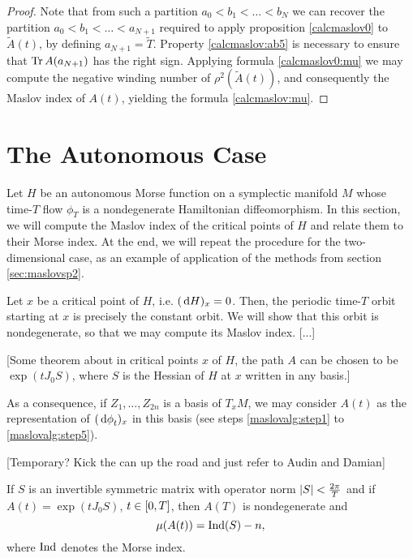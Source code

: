 \begin{proof}
Note that from such a partition $a_0 < b_1 < \dots < b_N$ we can recover the partition $a_0 < b_1 < \dots < a_{N+1}$ required to apply proposition \ref{calcmaslov0} to $\tilde A(t)$, by defining $a_{N+1} = \tilde T$. Property \ref{calcmaslov:ab5} is necessary to ensure that $\operatorname{Tr} A(a_{N+1})$ has the right sign. Applying formula \eqref{calcmaslov0:mu} we may compute the negative winding number of $\rho^2(\tilde A(t))$, and consequently the Maslov index of $A(t)$, yielding the formula \ref{calcmaslov:mu}.
\end{proof}

\section{The Autonomous Case}

Let $H$ be an autonomous Morse function on a symplectic manifold $M$ whose time-$T$ flow $\phi_T$ is a nondegenerate Hamiltonian diffeomorphism. In this section, we will compute the Maslov index of the critical points of $H$ and relate them to their Morse index. At the end, we will repeat the procedure for the two-dimensional case, as an example of application of the methods from section \ref{sec:maslovsp2}.

Let $x$ be a critical point of $H$, i.e. $(\dl H)_x = 0$. Then, the periodic time-$T$ orbit starting at $x$ is precisely the constant orbit. We will show that this orbit is nondegenerate, so that we may compute its Maslov index.
[...]

[Some theorem about in critical points $x$ of $H$, the path $A$ can be chosen to be $\exp(t J_0 S)$, where $S$ is the Hessian of $H$ at $x$ written in any basis.]

As a consequence, if $Z_1, \dots, Z_{2n}$ is a basis of $T_x M$, we may consider $A(t)$ as the representation of $(\dl \phi_t)_x$ in this basis (see steps \ref{maslovalg:step1} to \ref{maslovalg:step5}).

[Temporary? Kick the can up the road and just refer to Audin and Damian]

\begin{theorem}
If $S$ is an invertible symmetric matrix with operator norm $\lvert S\rvert < \frac{2\pi}T$ and if $A(t) = \exp(t J_0 S)$, $t \in \interval 0 T$, then $A(T)$ is nondegenerate and
\begin{equation}
\mu(A(t)) = \operatorname{Ind}(S) - n,
\end{equation}
where $\operatorname{Ind}$ denotes the Morse index.
\end{theorem}


